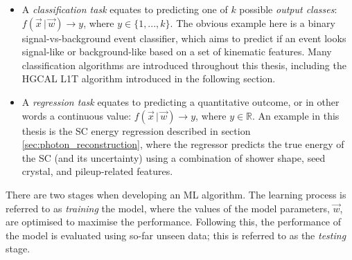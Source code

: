 \begin{itemize}
    \item A \textit{classification task} equates to predicting one of $k$ possible \textit{output classes}: $f(\vec{x}\,|\,\vec{w})\rightarrow y$, where $y\in \{1,...,k\}$. The obvious example here is a binary signal-vs-background event classifier, which aims to predict if an event looks signal-like or background-like based on a set of kinematic features. Many classification algorithms are introduced throughout this thesis, including the HGCAL L1T algorithm introduced in the following section.
    
    \item A \textit{regression task} equates to predicting a quantitative outcome, or in other words a continuous value: $f(\vec{x}\,|\,\vec{w})\rightarrow y$, where $y\in \mathbb{R}$. An example in this thesis is the SC energy regression described in section \ref{sec:photon_reconstruction}, where the regressor predicts the true energy of the SC (and its uncertainty) using a combination of shower shape, seed crystal, and pileup-related features.
\end{itemize}

There are two stages when developing an ML algorithm. The learning process is referred to as \textit{training} the model, where the values of the model parameters, $\vec{w}$, are optimised to maximise the performance. Following this, the performance of the model is evaluated using so-far unseen data; this is referred to as the \textit{testing} stage.

